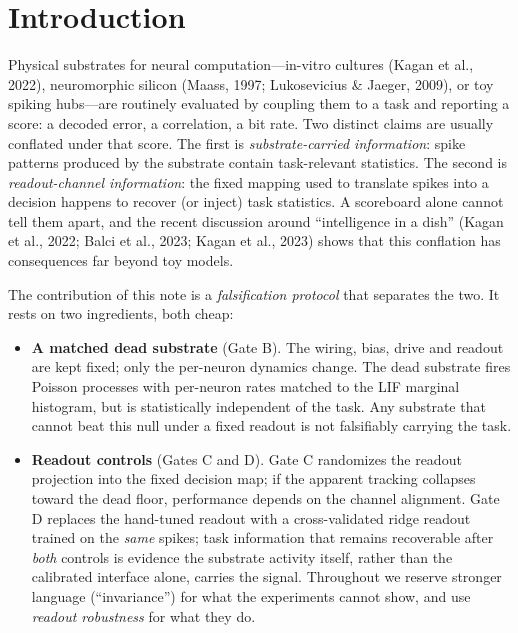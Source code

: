 \documentclass[12pt]{article}
\begin{document}
\section{Introduction}\label{sec:intro}

Physical substrates for neural computation---in-vitro cultures
(Kagan et al., 2022), neuromorphic silicon (Maass, 1997; Lukosevicius \& Jaeger, 2009), or toy spiking hubs---are routinely evaluated by
coupling them to a task and reporting a score: a decoded error, a
correlation, a bit rate. Two distinct claims are usually conflated
under that score. The first is \emph{substrate-carried information}:
spike patterns produced by the substrate contain task-relevant
statistics. The second is \emph{readout-channel information}: the
fixed mapping used to translate spikes into a decision happens to
recover (or inject) task statistics. A scoreboard alone cannot tell
them apart, and the recent discussion around ``intelligence in a
dish'' (Kagan et al., 2022; Balci et al., 2023; Kagan et al., 2023)
shows that this conflation has consequences far beyond toy models.

The contribution of this note is a \emph{falsification protocol} that
separates the two. It rests on two ingredients, both cheap:

\begin{itemize}[nosep]
\item \textbf{A matched dead substrate} (Gate B). The wiring, bias,
drive and readout are kept fixed; only the per-neuron dynamics change.
The dead substrate fires Poisson processes with per-neuron rates
matched to the LIF marginal histogram, but is statistically independent
of the task. Any substrate that cannot beat this null under a fixed
readout is not falsifiably carrying the task.
\item \textbf{Readout controls} (Gates C and D). Gate C randomizes the
readout projection into the fixed decision map; if the apparent tracking
collapses toward the dead floor, performance depends on the channel
alignment. Gate D replaces the hand-tuned readout with a
cross-validated ridge readout trained on the \emph{same} spikes; task
information that remains recoverable after \emph{both} controls is
evidence the substrate activity itself, rather than the calibrated
interface alone, carries the signal. Throughout we reserve stronger
language (``invariance'') for what the experiments cannot show, and use
\emph{readout robustness} for what they do.
\end{itemize}
\end{document}
